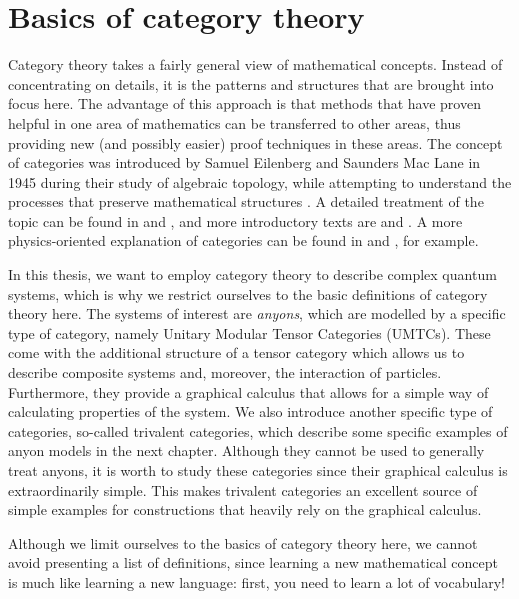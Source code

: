 \chapter{Basics of category theory}
\label{ch:cats}

	Category theory takes a fairly general view of mathematical concepts. Instead of concentrating on details, it is the patterns and structures that are brought into focus here. The advantage of this approach is that methods that have proven helpful in one area of mathematics can be transferred to other areas, thus providing new (and possibly easier) proof techniques in these areas. The concept of categories was introduced by Samuel Eilenberg and Saunders Mac Lane in 1945 during their study of algebraic topology, while attempting to understand the processes that preserve mathematical structures \cite{Eilenberg1945}. A detailed treatment of the topic can be found in \cite{MacLane1998} and \cite{Borceux1994}, and more introductory texts are \cite{Leinster2009} and \cite{Awodey2010}. A more physics-oriented explanation of categories can be found in \cite{Baez2010} and \cite{Beer2018}, for example.

	In this thesis, we want to employ category theory to describe complex quantum systems, which is why we restrict ourselves to the basic definitions of category theory here. The systems of interest are \emph{anyons}, which are modelled by a specific type of category, namely Unitary Modular Tensor Categories (UMTCs). These come with the additional structure of a tensor category which allows us to describe composite systems and, moreover, the interaction of particles. Furthermore, they provide a graphical calculus that allows for a simple way of calculating properties of the system. We also introduce another specific type of categories, so-called trivalent categories, which describe some specific examples of anyon models in the next chapter. Although they cannot be used to generally treat anyons, it is worth to study these categories since their graphical calculus is extraordinarily simple. This makes trivalent categories an excellent source of simple examples for constructions that heavily rely on the graphical calculus.
	
	Although we limit ourselves to the basics of category theory here, we cannot avoid presenting a list of definitions, since learning a new mathematical concept is much like learning a new language: first, you need to learn a lot of vocabulary! 



